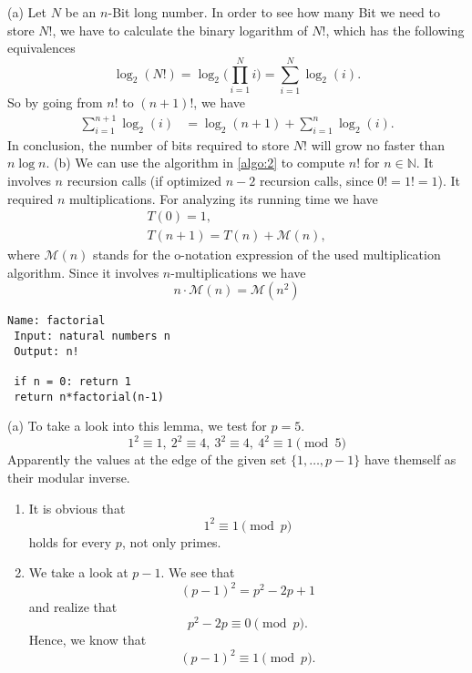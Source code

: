 \documentclass[12pt]{article}
\begin{document}
 
  (a) Let $N$ be an $n$-Bit long number. In order to see how many Bit we need to store $N!$, we have to calculate the binary logarithm of $N!$, which has the following equivalences \begin{equation}
 	\log_2(N!)= \log_2\bigg(\prod_{i=1}^{N}i\bigg) = \sum_{i=1}^N \log_2(i).
 \end{equation} So by going from $n!$ to $(n+1)!$, we have \begin{align}
 	\sum_{i=1}^{n+1} \log_2(i)&=\log_2(n+1) + \sum_{i=1}^{n} \log_2(i).
 \end{align} In conclusion, the number of bits required to store 
 $N!$ will grow no faster than $n\log n$.
 (b) We can use the algorithm in \autoref{algo:2} to compute $n!$ for $n\in\mathbb{N}$. It involves $n$ recursion calls (if optimized $n-2$ recursion calls, since $0!=1!=1$). It required $n$ multiplications. For analyzing its running time we have \begin{gather}
 	T(0)=1, \\
 	T(n+1)=T(n)+\mathcal{M}(n),
 \end{gather} where $\mathcal{M}(n)$ stands for the o-notation expression of the used multiplication algorithm. Since it involves $n$-multiplications we have \begin{equation}
 	n\cdot\mathcal{M}(n)=\mathcal{M}(n^2)
 \end{equation}
 
 \begin{lstlisting}[caption={Algorithm to compute factorial of a given number},label={algo:2}]
 Name: factorial
 Input: natural numbers n
 Output: n!
 
 if n = 0: return 1
 return n*factorial(n-1)
 \end{lstlisting} 
 
 (a) To take a look into this lemma, we test for $p=5$. \begin{equation}
 	1^2\equiv 1,\ 2^2\equiv 4,\ 3^2\equiv 4,\ 4^2\equiv 1 \pmod{5}
 \end{equation}
 Apparently the values at the edge of the given set $\{1, \ldots, p-1\}$ have themself as their modular inverse. \begin{enumerate}
 	\item It is obvious that \begin{equation}
 		1^2 \equiv 1 \pmod{p}
 	\end{equation} holds for every $p$, not only primes.
 	\item We take a look at $p-1$. We see that \begin{equation}
 		(p-1)^2=p^2-2p+1
 	\end{equation} and realize that \begin{equation}
 		p^2-2p \equiv 0 \pmod{p}.
 	\end{equation} Hence, we know that \begin{equation}
 		(p-1)^2 \equiv 1 \pmod{p}.
 	\end{equation}
 \end{enumerate}
\end{document}
